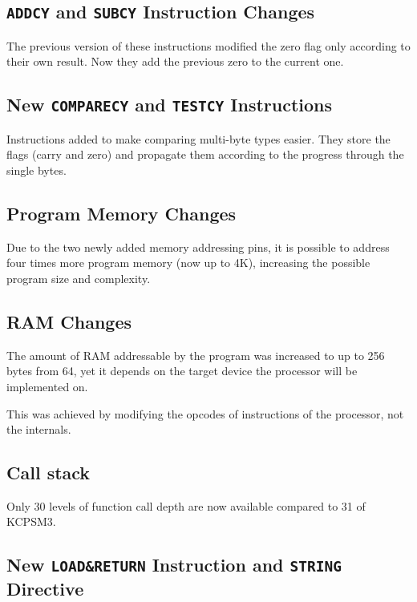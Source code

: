         \subsection{\texttt{ADDCY} and \texttt{SUBCY} Instruction Changes}

        The previous version of these instructions modified the zero flag only according to their own result. Now they add the previous zero to the current one.

        \subsection{New \texttt{COMPARECY} and \texttt{TESTCY} Instructions}

        Instructions added to make comparing multi-byte types easier. They store the flags (carry and zero) and propagate them according to the progress through the single bytes.

        \subsection{Program Memory Changes}

        Due to the two newly added memory addressing pins, it is possible to address four times more program memory (now up to 4K), increasing the possible program size and complexity.

        \subsection{RAM Changes}

        The amount of RAM addressable by the program was increased to up to 256 bytes from 64, yet it depends on the target device the processor will be implemented on. 

        This was achieved by modifying the opcodes of instructions of the processor, not the internals.

        \subsection{Call stack}

        Only 30 levels of function call depth are now available compared to 31 of KCPSM3.

        \subsection{New \texttt{LOAD\&RETURN} Instruction and \texttt{STRING} Directive}

